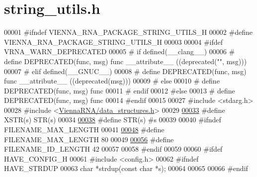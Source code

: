 \hypertarget{string__utils_8h_source}{}\section{string\+\_\+utils.\+h}
\label{string__utils_8h_source}

\begin{DoxyCode}
00001 \textcolor{preprocessor}{#ifndef VIENNA\_RNA\_PACKAGE\_STRING\_UTILS\_H}
00002 \textcolor{preprocessor}{#define VIENNA\_RNA\_PACKAGE\_STRING\_UTILS\_H}
00003 
00004 \textcolor{preprocessor}{#ifdef VRNA\_WARN\_DEPRECATED}
00005 \textcolor{preprocessor}{# if defined(\_\_clang\_\_)}
00006 \textcolor{preprocessor}{#  define DEPRECATED(func, msg) func \_\_attribute\_\_ ((deprecated("", msg)))}
00007 \textcolor{preprocessor}{# elif defined(\_\_GNUC\_\_)}
00008 \textcolor{preprocessor}{#  define DEPRECATED(func, msg) func \_\_attribute\_\_ ((deprecated(msg)))}
00009 \textcolor{preprocessor}{# else}
00010 \textcolor{preprocessor}{#  define DEPRECATED(func, msg) func}
00011 \textcolor{preprocessor}{# endif}
00012 \textcolor{preprocessor}{#else}
00013 \textcolor{preprocessor}{# define DEPRECATED(func, msg) func}
00014 \textcolor{preprocessor}{#endif}
00015 
00027 \textcolor{preprocessor}{#include <stdarg.h>}
00028 \textcolor{preprocessor}{#include <\hyperlink{data__structures_8h}{ViennaRNA/data\_structures.h}>}
00029 
\hyperlink{group__string__utils_ga03943706e48069237cd57f2d35ca987e}{00033} \textcolor{preprocessor}{#define XSTR(s) STR(s)}
00034 
\hyperlink{group__string__utils_ga6388870e639eee9c0a69446876f1f8cc}{00038} \textcolor{preprocessor}{#define STR(s) #s}
00039 
00040 \textcolor{preprocessor}{#ifndef FILENAME\_MAX\_LENGTH}
00041 
\hyperlink{group__string__utils_gafb228174279df9486a5cb56ac0bc79a3}{00048} \textcolor{preprocessor}{#define FILENAME\_MAX\_LENGTH   80}
00049 
\hyperlink{group__string__utils_ga33c3b1826b8e2739f09f111ec719ded5}{00056} \textcolor{preprocessor}{#define FILENAME\_ID\_LENGTH    42}
00057 
00058 \textcolor{preprocessor}{#endif}
00059 
00060 \textcolor{preprocessor}{#ifdef HAVE\_CONFIG\_H}
00061 \textcolor{preprocessor}{#include <config.h>}
00062 \textcolor{preprocessor}{#ifndef HAVE\_STRDUP}
00063 \textcolor{keywordtype}{char} *strdup(\textcolor{keyword}{const} \textcolor{keywordtype}{char} *s);
00064 
00065 
00066 \textcolor{preprocessor}{#endif}

\end{DoxyCode}
